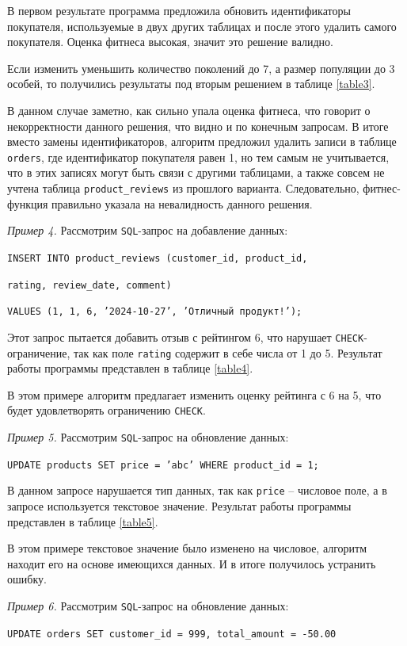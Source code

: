 \documentclass[master,paper]{pmk-graduate}
\begin{document}
В первом результате программа предложила обновить идентификаторы покупателя, используемые в двух других таблицах и после этого удалить самого покупателя. Оценка фитнеса высокая, значит это решение валидно.

Если изменить уменьшить количество поколений до 7, а размер популяции до 3 особей, то получились результаты под вторым решением в таблице \ref{table3}.

В данном случае заметно, как сильно упала оценка фитнеса, что говорит о некорректности данного решения, что видно и по конечным запросам. В итоге вместо замены идентификаторов, алгоритм предложил удалить записи в таблице \texttt{orders}, где идентификатор покупателя равен 1, но тем самым не учитывается, что в этих записях могут быть связи с другими таблицами, а также совсем не учтена таблица \texttt{product\_reviews} из прошлого варианта. Следовательно, фитнес-функция правильно указала на невалидность данного решения.

\textit{Пример 4.} Рассмотрим \texttt{SQL}-запрос на добавление данных:

\texttt{INSERT INTO product\_reviews (customer\_id, product\_id,} 

\texttt{rating, review\_date, comment)}

\texttt{VALUES (1, 1, 6, '2024-10-27', 'Отличный продукт!');}

Этот запрос пытается добавить отзыв с рейтингом 6, что нарушает \texttt{CHECK}-ограничение, так как поле \texttt{rating} содержит в себе числа от 1 до 5. Результат работы программы представлен в таблице \ref{table4}.

В этом примере алгоритм предлагает изменить оценку рейтинга с 6 на 5, что будет удовлетворять ограничению \texttt{CHECK}.


\textit{Пример 5.} Рассмотрим \texttt{SQL}-запрос на обновление данных:

\texttt{UPDATE products SET price = 'abc' WHERE product\_id = 1;} 

В данном запросе нарушается тип данных, так как \texttt{price} -- числовое поле, а в запросе используется текстовое значение. Результат работы программы представлен в таблице \ref{table5}.


В этом примере текстовое значение было изменено на числовое, алгоритм находит его на основе имеющихся данных. И в итоге получилось устранить ошибку.

\textit{Пример 6.} Рассмотрим \texttt{SQL}-запрос на обновление данных:

\texttt{UPDATE orders SET customer\_id = 999, total\_amount = -50.00}
\end{document}
